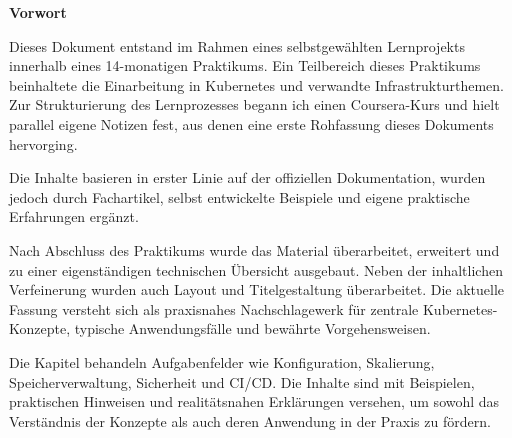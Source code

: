 \clearpage
\thispagestyle{empty}
\vspace*{\fill}

\begin{center}
  {\normalfont\huge\bfseries Vorwort}
\end{center}
\vspace{1em}

{
\setlength{\parindent}{0pt}
\setlength{\parskip}{0.5em}

\begin{adjustwidth}{2.5cm}{2.5cm}

Dieses Dokument entstand im Rahmen eines selbstgewählten Lernprojekts innerhalb eines 14-monatigen Praktikums. Ein Teilbereich dieses Praktikums beinhaltete die Einarbeitung in Kubernetes und verwandte Infrastrukturthemen. Zur Strukturierung des Lernprozesses begann ich einen Coursera-Kurs und hielt parallel eigene Notizen fest, aus denen eine erste Rohfassung dieses Dokuments hervorging.

Die Inhalte basieren in erster Linie auf der offiziellen Dokumentation, wurden jedoch durch Fachartikel, selbst entwickelte Beispiele und eigene praktische Erfahrungen ergänzt.

Nach Abschluss des Praktikums wurde das Material überarbeitet, erweitert und zu einer eigenständigen technischen Übersicht ausgebaut. Neben der inhaltlichen Verfeinerung wurden auch Layout und Titelgestaltung überarbeitet. Die aktuelle Fassung versteht sich als praxisnahes Nachschlagewerk für zentrale Kubernetes-Konzepte, typische Anwendungsfälle und bewährte Vorgehensweisen.

Die Kapitel behandeln Aufgabenfelder wie Konfiguration, Skalierung, Speicherverwaltung, Sicherheit und CI/CD. Die Inhalte sind mit Beispielen, praktischen Hinweisen und realitätsnahen Erklärungen versehen, um sowohl das Verständnis der Konzepte als auch deren Anwendung in der Praxis zu fördern.

\end{adjustwidth}
}

\vfill
\clearpage
